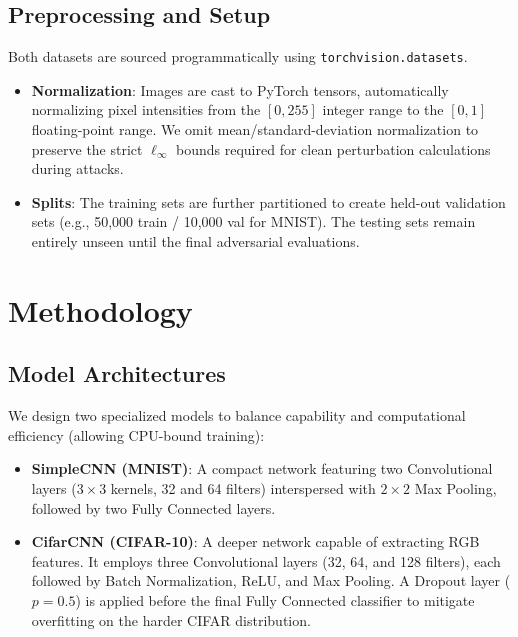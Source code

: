 \documentclass[conference,10pt]{IEEEtran}
\begin{document}
\subsection{Preprocessing and Setup}
Both datasets are sourced programmatically using \texttt{torchvision.datasets}. 
\begin{itemize}
    \item \textbf{Normalization}: Images are cast to PyTorch tensors, automatically normalizing pixel intensities from the $[0, 255]$ integer range to the $[0, 1]$ floating-point range. We omit mean/standard-deviation normalization to preserve the strict $\ell_\infty$ bounds required for clean perturbation calculations during attacks.
    \item \textbf{Splits}: The training sets are further partitioned to create held-out validation sets (e.g., 50,000 train / 10,000 val for MNIST). The testing sets remain entirely unseen until the final adversarial evaluations.
\end{itemize}


\section{Methodology}

\subsection{Model Architectures}
We design two specialized models to balance capability and computational efficiency (allowing CPU-bound training):
\begin{itemize}
    \item \textbf{SimpleCNN (MNIST)}: A compact network featuring two Convolutional layers ($3 \times 3$ kernels, 32 and 64 filters) interspersed with $2 \times 2$ Max Pooling, followed by two Fully Connected layers.
    \item \textbf{CifarCNN (CIFAR-10)}: A deeper network capable of extracting RGB features. It employs three Convolutional layers (32, 64, and 128 filters), each followed by Batch Normalization, ReLU, and Max Pooling. A Dropout layer ($p=0.5$) is applied before the final Fully Connected classifier to mitigate overfitting on the harder CIFAR distribution.
\end{itemize}
\end{document}
